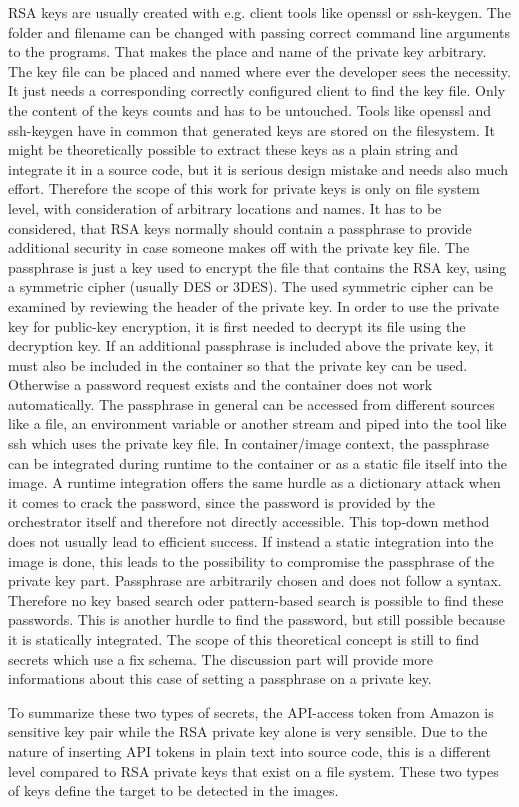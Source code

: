 RSA keys are usually created with e.g. client tools like openssl or ssh-keygen. The folder and filename can be changed with passing correct command line arguments to the programs. That makes the place and name of the private key arbitrary. The key file can be placed and named where ever the developer sees the necessity. It just needs a corresponding correctly configured client to find the key file. Only the content of the keys counts and has to be untouched. 
Tools like openssl and ssh-keygen have in common that generated keys are stored on the filesystem. It might be theoretically possible to extract these keys as a plain string and integrate it in a source code, but it is serious design mistake and needs also much effort. Therefore the scope of this work for private keys is only on file system level, with consideration of arbitrary locations and names.
It has to be considered, that RSA keys normally should contain a passphrase to provide additional security in case someone makes off with the private key file. The passphrase is just a key used to encrypt the file that contains the RSA key, using a symmetric cipher (usually DES or 3DES). The used symmetric cipher can be examined by reviewing the header of the private key. In order to use the private key for public-key encryption, it is first needed to decrypt its file using the decryption key.
If an additional passphrase is included above the private key, it must also be included in the container so that the private key can be used. Otherwise a password request exists and the container does not work automatically. 
The passphrase in general can be accessed from different sources like a file, an environment variable or another stream and piped into the tool like ssh which uses the private key file.
In container/image context, the passphrase can be integrated during runtime to the container or as a static file itself into the image. A runtime integration offers the same hurdle as a dictionary attack when it comes to crack the password, since the password is provided by the orchestrator itself and therefore not directly accessible. This top-down method does not usually lead to efficient success. If instead a static integration into the image is done, this leads to the possibility to compromise the passphrase of the private key part. 
Passphrase are arbitrarily chosen and does not follow a syntax. Therefore no key based search oder pattern-based search is possible to find these passwords. This is another hurdle to find the password, but still possible because it is statically integrated. The scope of this theoretical concept is still to find secrets which use a fix schema. The discussion part will provide more informations about this case of setting a passphrase on a private key.

To summarize these two types of secrets, the API-access token from Amazon is sensitive key pair while the RSA private key alone is very sensible. 
Due to the nature of inserting API tokens in plain text into source code, this is a different level compared to RSA private keys that exist on a file system.
These two types of keys define the target to be detected in the images.

